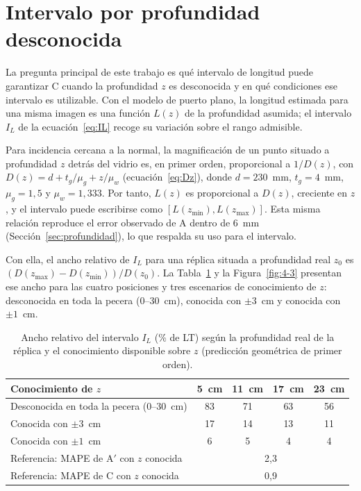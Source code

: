 \documentclass{report}
\newcommand{\Aprime}{A$'$}
\newcommand{\IL}{I_L}
\begin{document}
\section{Intervalo por profundidad desconocida}
\label{sec:intervalo}

La pregunta principal de este trabajo es qué intervalo de longitud puede garantizar C cuando la profundidad $z$ es desconocida y en qué condiciones ese intervalo es utilizable. Con el modelo de puerto plano, la longitud estimada para una misma imagen es una función $L(z)$ de la profundidad asumida; el intervalo $\IL$ de la ecuación~\eqref{eq:IL} recoge su variación sobre el rango admisible.

Para incidencia cercana a la normal, la magnificación de un punto situado a profundidad $z$ detrás del vidrio es, en primer orden, proporcional a $1/D(z)$, con $D(z) = d + t_g/\mu_g + z/\mu_w$ (ecuación~\ref{eq:Dz}), donde $d = 230$~mm, $t_g = 4$~mm, $\mu_g = 1{,}5$ y $\mu_w = 1{,}333$. Por tanto, $L(z)$ es proporcional a $D(z)$, creciente en $z$, y el intervalo puede escribirse como $[L(z_{\min}), L(z_{\max})]$. Esta misma relación reproduce el error observado de A dentro de 6~mm (Sección~\ref{sec:profundidad}), lo que respalda su uso para el intervalo.

Con ella, el ancho relativo de $\IL$ para una réplica situada a profundidad real $z_0$ es $(D(z_{\max}) - D(z_{\min}))/D(z_0)$. La Tabla~\ref{tab:intervalo} y la Figura~\ref{fig:4-3} presentan ese ancho para las cuatro posiciones y tres escenarios de conocimiento de $z$: desconocida en toda la pecera (0--30~cm), conocida con $\pm 3$~cm y conocida con $\pm 1$~cm.

\begin{table}[htbp]

\caption{Ancho relativo del intervalo $\IL$ (\% de LT) según la profundidad real de la réplica y el conocimiento disponible sobre $z$ (predicción geométrica de primer orden).}
\label{tab:intervalo}
\begin{tabular}{@{}lcccc@{}}
\hline
Conocimiento de $z$ & 5~cm & 11~cm & 17~cm & 23~cm \\
\hline
Desconocida en toda la pecera (0--30~cm) & 83 & 71 & 63 & 56 \\
Conocida con $\pm 3$~cm & 17 & 14 & 13 & 11 \\
Conocida con $\pm 1$~cm & 6 & 5 & 4 & 4 \\
\hline
Referencia: MAPE de \Aprime{} con $z$ conocida & \multicolumn{4}{c}{2,3} \\
Referencia: MAPE de C con $z$ conocida & \multicolumn{4}{c}{0,9} \\
\hline
\end{tabular}
\end{table}
\end{document}
